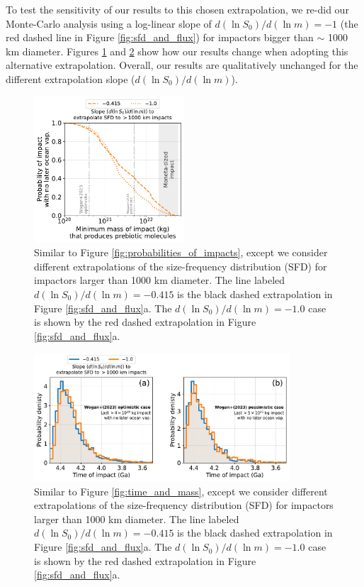 \documentclass[manuscript]{aastex63}
\begin{document}
To test the sensitivity of our results to this chosen extrapolation, we re-did our Monte-Carlo analysis using a log-linear slope of $d (\ln S_0)/d (\ln m) = - 1$ (the red dashed line in Figure \ref{fig:sfd_and_flux}) for impactors bigger than $\sim$ 1000 km diameter. Figures \ref{fig:probabilities_of_impacts_extrapolation_sens} and \ref{fig:timing_extrapolation_sensitivity} show how our results change when adopting this alternative extrapolation. Overall, our results are qualitatively unchanged for the different extrapolation slope ($d (\ln S_0)/d (\ln m)$).

\begin{figure}
  \centering
  \includegraphics[width=0.5\textwidth]{figures/probabilities_of_impacts_extrapolation_sens.pdf}
  \caption{Similar to Figure \ref{fig:probabilities_of_impacts}, except we consider different extrapolations of the size-frequency distribution (SFD) for impactors larger than 1000 km diameter. The line labeled $d (\ln S_0)/d (\ln m) = - 0.415$ is the black dashed extrapolation in Figure \ref{fig:sfd_and_flux}a. The $d (\ln S_0)/d (\ln m) = - 1.0$ case is shown by the red dashed extrapolation in Figure \ref{fig:sfd_and_flux}a.}
  \label{fig:probabilities_of_impacts_extrapolation_sens}
\end{figure}

\begin{figure}
  \centering
  \includegraphics[width=0.85\textwidth]{figures/timing_extrapolation_sensitivity.pdf}
  \caption{Similar to Figure \ref{fig:time_and_mass}, except we consider different extrapolations of the size-frequency distribution (SFD) for impactors larger than 1000 km diameter. The line labeled $d (\ln S_0)/d (\ln m) = - 0.415$ is the black dashed extrapolation in Figure \ref{fig:sfd_and_flux}a. The $d (\ln S_0)/d (\ln m) = - 1.0$ case is shown by the red dashed extrapolation in Figure \ref{fig:sfd_and_flux}a.}
  \label{fig:timing_extrapolation_sensitivity}
\end{figure}
\end{document}
